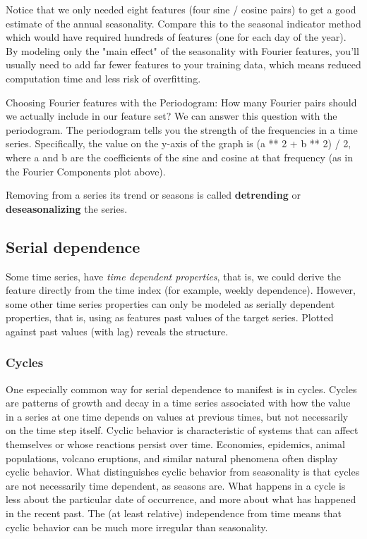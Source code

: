 \documentclass[12pt]{report}
\begin{document}
Notice that we only needed eight features (four sine / cosine pairs) to get a good estimate of the annual seasonality. Compare this to the seasonal indicator method which would have required hundreds of features (one for each day of the year). By modeling only the "main effect" of the seasonality with Fourier features, you'll usually need to add far fewer features to your training data, which means reduced computation time and less risk of overfitting.

Choosing Fourier features with the Periodogram:
How many Fourier pairs should we actually include in our feature set? We can answer this question with the periodogram. The periodogram tells you the strength of the frequencies in a time series. Specifically, the value on the y-axis of the graph is (a ** 2 + b ** 2) / 2, where a and b are the coefficients of the sine and cosine at that frequency (as in the Fourier Components plot above).

Removing from a series its trend or seasons is called \textbf{detrending} or \textbf{deseasonalizing} the series.


\subsection{Serial dependence}
Some time series, have \textit{time dependent properties}, that is, we could derive the feature directly from the time index (for example, weekly dependence). However, some other time series properties can only be modeled as serially dependent properties, that is, using as features past values of the target series. Plotted against past values (with lag) reveals the structure.

\subsubsection{Cycles} One especially common way for serial dependence to manifest is in cycles. Cycles are patterns of growth and decay in a time series associated with how the value in a series at one time depends on values at previous times, but not necessarily on the time step itself. Cyclic behavior is characteristic of systems that can affect themselves or whose reactions persist over time. Economies, epidemics, animal populations, volcano eruptions, and similar natural phenomena often display cyclic behavior. What distinguishes cyclic behavior from seasonality is that cycles are not necessarily time dependent, as seasons are. What happens in a cycle is less about the particular date of occurrence, and more about what has happened in the recent past. The (at least relative) independence from time means that cyclic behavior can be much more irregular than seasonality.
\end{document}
